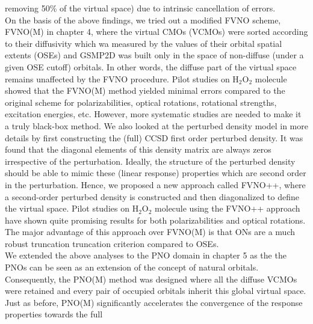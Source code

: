 removing 50\% of the virtual space) due to intrinsic cancellation of errors.\\
On the basis of the above findings, we tried out a modified FVNO scheme, FVNO(M)
in chapter 4, where the virtual CMOs (VCMOs) were sorted according to their diffusivity which 
wa measured by the values of their orbital spatial extents (OSEs) and GSMP2D was 
built only in the space of non-diffuse (under a given OSE cutoff) orbitals. 
In other words, the diffuse part of the virtual space remains unaffected 
by the FVNO procedure. Pilot studies on H$_2$O$_2$ molecule showed that the
FVNO(M) method yielded minimal errors compared to the original scheme 
for polarizabilities, optical rotations, rotational strengths, 
excitation energies, etc. However, more systematic studies are needed to 
make it a truly black-box method. We also looked at the perturbed density 
model in more details by first constructing the (full) CCSD first order 
perturbed density. It was found that the diagonal elements of this density 
matrix are always zeros irrespective of the perturbation. Ideally, the structure
of the perturbed density should be able to mimic these (linear response) properties 
which are second order in the perturbation. Hence, we proposed a new approach called
FVNO++, where a second-order perturbed density is constructed and then diagonalized
to define the virtual space. Pilot studies on H$_2$O$_2$ molecule using the FVNO++
approach have shown quite promising results for both polarizabilities and optical
rotations. The major advantage of this approach over FVNO(M) is that ONs are 
a much robust truncation truncation criterion compared to OSEs.\\
We extended the above analyses to the PNO domain in chapter 5 as the  
the PNOs can be seen as an extension of the concept of 
natural orbitals. Consequently, the PNO(M) method was designed where
all the diffuse VCMOs were retained and every pair of occupied orbitals
inherit this global virtual space. Just as before, PNO(M) significantly
accelerates the convergence of the response properties towards the full

